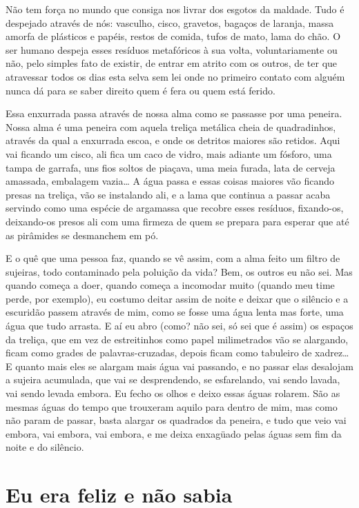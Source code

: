 Não tem força no mundo que consiga nos livrar dos esgotos da maldade.
Tudo é despejado através de nós: vasculho, cisco, gravetos, bagaços
de laranja, massa amorfa de plásticos e papéis, restos de comida,
tufos de mato, lama do chão. O ser humano despeja esses resíduos
metafóricos à sua volta, voluntariamente ou não, pelo simples fato de
existir, de entrar em atrito com os outros, de ter que atravessar
todos os dias esta selva sem lei onde no primeiro contato com alguém
nunca dá para se saber direito quem é fera ou quem está ferido.

Essa enxurrada passa através de nossa alma como se passasse por uma
peneira. Nossa alma é uma peneira com aquela treliça metálica cheia
de quadradinhos, através da qual a enxurrada escoa, e onde os
detritos maiores são retidos. Aqui vai ficando um cisco, ali fica um
caco de vidro, mais adiante um fósforo, uma tampa de garrafa, uns
fios soltos de piaçava, uma meia furada, lata de cerveja amassada,
embalagem vazia… A água passa e essas coisas maiores vão ficando
presas na treliça, vão se instalando ali, e a lama que continua a
passar acaba servindo como uma espécie de argamassa que recobre esses
resíduos, fixando-os, deixando-os presos ali com uma firmeza de quem
se prepara para esperar que até as pirâmides se desmanchem em pó.

E o quê que uma pessoa faz, quando se vê assim, com a alma feito um
filtro de sujeiras, todo contaminado pela poluição da vida? Bem, os
outros eu não sei. Mas quando começa a doer, quando começa a
incomodar muito (quando meu time perde, por exemplo), eu costumo
deitar assim de noite e deixar que o silêncio e a escuridão passem
através de mim, como se fosse uma água lenta mas forte, uma água que
tudo arrasta. E aí eu abro (como? não sei, só sei que é assim) os
espaços da treliça, que em vez de estreitinhos como papel
milimetrados vão se alargando, ficam como grades de
palavras-cruzadas, depois ficam como tabuleiro de xadrez… E quanto
mais eles se alargam mais água vai passando, e no passar elas
desalojam a sujeira acumulada, que vai se desprendendo, se
esfarelando, vai sendo lavada, vai sendo levada embora. Eu fecho os
olhos e deixo essas águas rolarem. São as mesmas águas do tempo que
trouxeram aquilo para dentro de mim, mas como não param de passar,
basta alargar os quadrados da peneira, e tudo que veio vai embora,
vai embora, vai embora, e me deixa enxagüado pelas águas sem fim da
noite e do silêncio.

\chapter{Eu era feliz e não sabia}

